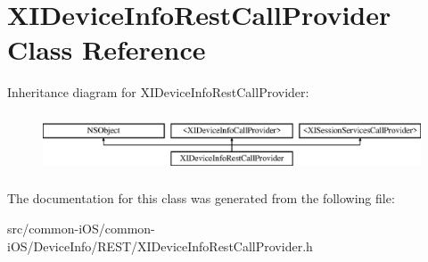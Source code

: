 \hypertarget{interface_x_i_device_info_rest_call_provider}{}\section{X\+I\+Device\+Info\+Rest\+Call\+Provider Class Reference}
\label{interface_x_i_device_info_rest_call_provider}
Inheritance diagram for X\+I\+Device\+Info\+Rest\+Call\+Provider\+:\begin{figure}[H]
\begin{center}
\leavevmode
\includegraphics[height=1.769352cm]{interface_x_i_device_info_rest_call_provider}
\end{center}
\end{figure}


The documentation for this class was generated from the following file\+:\begin{DoxyCompactItemize}
\item 
src/common-\/i\+O\+S/common-\/i\+O\+S/\+Device\+Info/\+R\+E\+S\+T/X\+I\+Device\+Info\+Rest\+Call\+Provider.\+h\end{DoxyCompactItemize}
